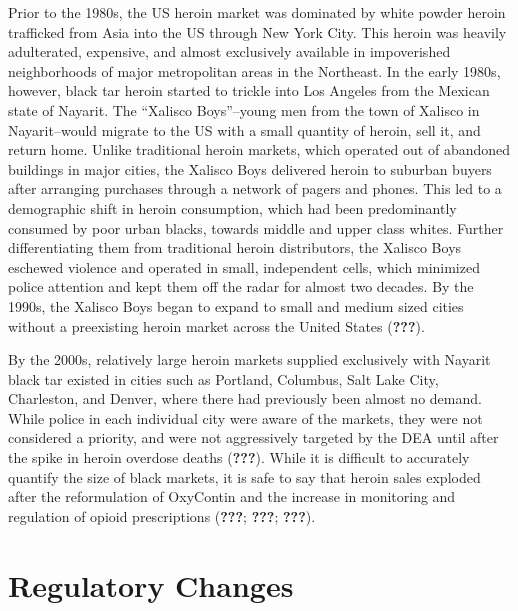 \documentclass[12pt,twoside]{reedthesis}
\begin{document}
Prior to the 1980s, the US heroin market was dominated by white powder heroin trafficked from Asia into the US through New York City. This heroin was heavily adulterated, expensive, and almost exclusively available in impoverished neighborhoods of major metropolitan areas in the Northeast. In the early 1980s, however, black tar heroin started to trickle into Los Angeles from the Mexican state of Nayarit. The ``Xalisco Boys''--young men from the town of Xalisco in Nayarit--would migrate to the US with a small quantity of heroin, sell it, and return home. Unlike traditional heroin markets, which operated out of abandoned buildings in major cities, the Xalisco Boys delivered heroin to suburban buyers after arranging purchases through a network of pagers and phones. This led to a demographic shift in heroin consumption, which had been predominantly consumed by poor urban blacks, towards middle and upper class whites. Further differentiating them from traditional heroin distributors, the Xalisco Boys eschewed violence and operated in small, independent cells, which minimized police attention and kept them off the radar for almost two decades. By the 1990s, the Xalisco Boys began to expand to small and medium sized cities without a preexisting heroin market across the United States ({\textbf{???}}).

By the 2000s, relatively large heroin markets supplied exclusively with Nayarit black tar existed in cities such as Portland, Columbus, Salt Lake City, Charleston, and Denver, where there had previously been almost no demand. While police in each individual city were aware of the markets, they were not considered a priority, and were not aggressively targeted by the DEA until after the spike in heroin overdose deaths ({\textbf{???}}). While it is difficult to accurately quantify the size of black markets, it is safe to say that heroin sales exploded after the reformulation of OxyContin and the increase in monitoring and regulation of opioid prescriptions ({\textbf{???}}; {\textbf{???}}; {\textbf{???}}).

\hypertarget{regulatory-changes}{%
\section{Regulatory Changes}\label{regulatory-changes}}
\end{document}

